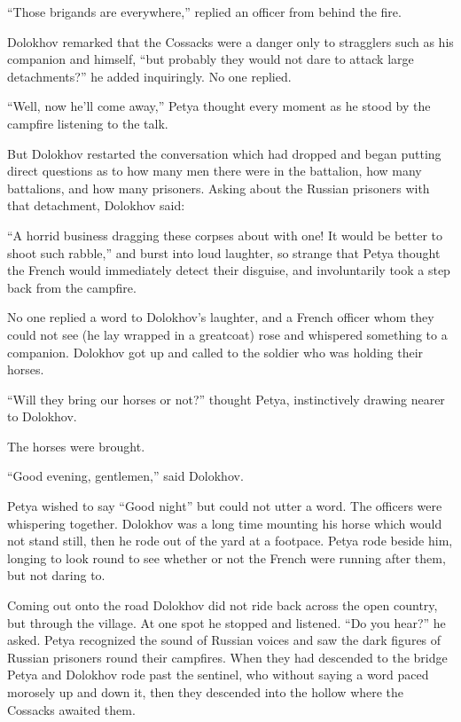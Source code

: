 ``Those brigands are everywhere,'' replied an officer from behind
the fire.

Dolokhov remarked that the Cossacks were a danger only to
stragglers such as his companion and himself, ``but probably they
would not dare to attack large detachments?'' he added
inquiringly. No one replied.

``Well, now he'll come away,'' Petya thought every moment as he
stood by the campfire listening to the talk.

But Dolokhov restarted the conversation which had dropped and
began putting direct questions as to how many men there were in
the battalion, how many battalions, and how many
prisoners. Asking about the Russian prisoners with that
detachment, Dolokhov said:

``A horrid business dragging these corpses about with one! It
would be better to shoot such rabble,'' and burst into loud
laughter, so strange that Petya thought the French would
immediately detect their disguise, and involuntarily took a step
back from the campfire.

No one replied a word to Dolokhov's laughter, and a French
officer whom they could not see (he lay wrapped in a greatcoat)
rose and whispered something to a companion. Dolokhov got up and
called to the soldier who was holding their horses.

``Will they bring our horses or not?'' thought Petya,
instinctively drawing nearer to Dolokhov.

The horses were brought.

``Good evening, gentlemen,'' said Dolokhov.

Petya wished to say ``Good night'' but could not utter a
word. The officers were whispering together. Dolokhov was a long
time mounting his horse which would not stand still, then he rode
out of the yard at a footpace. Petya rode beside him, longing to
look round to see whether or not the French were running after
them, but not daring to.

Coming out onto the road Dolokhov did not ride back across the
open country, but through the village. At one spot he stopped and
listened.  ``Do you hear?'' he asked. Petya recognized the sound
of Russian voices and saw the dark figures of Russian prisoners
round their campfires.  When they had descended to the bridge
Petya and Dolokhov rode past the sentinel, who without saying a
word paced morosely up and down it, then they descended into the
hollow where the Cossacks awaited them.


